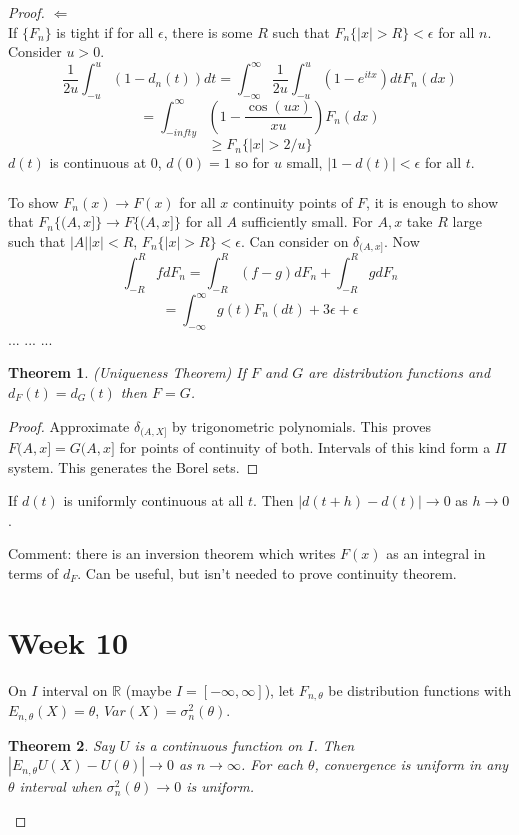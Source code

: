 \documentclass[12pt]{article}
\newtheorem{theorem}{Theorem}
\begin{document}
\begin{proof}
$\Leftarrow$\\
If $\{F_n\}$ is tight if for all $\epsilon$, there is some $R$ such that $F_n \{ |x| > R \} < \epsilon$ for all $n$.  Consider $u > 0$.
$$\frac{1}{2u} \int_{-u}^u (1 - d_n(t)) dt = \int_{-\infty}^\infty \frac{1}{2u} \int_{-u}^u (1 - e^{itx}) dt F_n(dx)$$
$$ = \int_{-infty}^\infty (1 - \frac{\cos(ux)}{xu}) F_n(dx) $$
$$ \ge F_n \{ |x| > 2/u \} $$
$d(t)$ is continuous at 0, $d(0) = 1$ so for $u$ small, $|1 - d(t) | < \epsilon$ for all $t$.
\\ \\
To show $F_n(x) \to F(x)$ for all $x$ continuity points of $F$, it is enough to show that $F_n \{ (A, x] \} \rightarrow F \{ (A, x] \}$ for all $A$ sufficiently small.  For $A, x$ take $R$ large such that $|A||x| < R$, $F_n \{ |x| > R \} < \epsilon$.  Can consider on $\delta_{(A, x]}$.  Now
$$\int_{-R}^R f dF_n = \int_{-R}^R (f - g) d F_n + \int_{-R}^R g dF_n$$
$$= \int_{-\infty}^\infty g(t) F_n (dt) + 3 \epsilon + \epsilon$$
...
...
...

\begin{theorem}
(Uniqueness Theorem)
If $F$ and $G$ are distribution functions and $d_F(t) = d_G(t)$ then $F = G$.
\end{theorem}
\begin{proof}
Approximate $\delta_{(A, X]}$ by trigonometric polynomials.  This proves $F(A, x] = G(A, x]$ for points of continuity of both.  Intervals of this kind form a $\Pi$ system.  This generates the Borel sets.
\end{proof}If $d(t)$ is uniformly continuous at all $t$.  Then $|d(t + h) - d(t) | \to 0$ as $h \to 0$.

Comment: there is an inversion theorem which writes $F(x)$ as an integral in terms of $d_F$.  Can be useful, but isn't needed to prove continuity theorem.

\section{Week 10}
On $I$ interval on $\mathbb{R}$ (maybe $I = [-\infty, \infty]$), let $F_{n, \theta}$ be distribution functions with $E_{n, \theta}(X) = \theta$, $Var(X) = \sigma_n^2(\theta)$.
\begin{theorem}
Say $U$ is a continuous function on $I$.  Then $|E_{n, \theta} U(X) - U(\theta) | \to 0$ as $n \to \infty$.  For each $\theta$, convergence is uniform in any $\theta$ interval when $\sigma_n^2(\theta) \to 0$ is uniform.
\end{theorem}


\end{proof}
\end{document}
